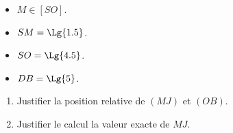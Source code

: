 \begin{exercice*}
\begin{minipage}{0.7\linewidth}
{    
        }
    \end{minipage}
    \begin{minipage}{0.3\linewidth}
        \begin{itemize}
            \item $M \in [SO]$.
            \item $SM=\Lg{1.5}$.
            \item $SO=\Lg{4.5}$.
            \item $DB=\Lg{5}$.
        \end{itemize}
    \end{minipage}
    \begin{enumerate}
        \item Justifier la position relative de $(MJ)$ et $(OB)$.
        \item Justifier le calcul la valeur exacte de $MJ$.
    \end{enumerate}
\end{exercice*}
